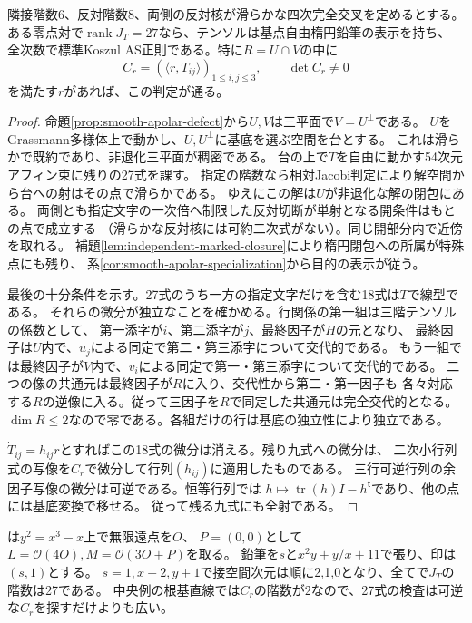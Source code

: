 \begin{theorem}[非横断点を通る相対Jacobi判定]\label{thm:marked-gram-smoothing}
隣接階数6、反対階数8、両側の反対核が滑らかな四次完全交叉を定めるとする。
ある零点対で$\operatorname{rank}J_T=27$なら、テンソルは基点自由楕円鉛筆の表示を持ち、
全次数で標準Koszul AS正則である。特に$R=U\cap V$の中に
\[
 C_r=(\langle r,T_{ij}\rangle)_{1\le i,j\le3},\qquad \det C_r\ne0
\]
を満たす$r$があれば、この判定が通る。
\end{theorem}
\begin{proof}
命題\ref{prop:smooth-apolar-defect}から$U,V$は三平面で$V=U^\perp$である。
$U$をGrassmann多様体上で動かし、$U,U^\perp$に基底を選ぶ空間を台とする。
これは滑らかで既約であり、非退化三平面が稠密である。
台の上で$T$を自由に動かす54次元アフィン束に残りの27式を課す。
指定の階数なら相対Jacobi判定により解空間から台への射はその点で滑らかである。
ゆえにこの解は$U$が非退化な解の閉包にある。
両側とも指定文字の一次倍へ制限した反対切断が単射となる開条件はもとの点で成立する
（滑らかな反対核には可約二次式がない）。同じ開部分内で近傍を取れる。
補題\ref{lem:independent-marked-closure}により楕円閉包への所属が特殊点にも残り、
系\ref{cor:smooth-apolar-specialization}から目的の表示が従う。

最後の十分条件を示す。27式のうち一方の指定文字だけを含む18式は$T$で線型である。
それらの微分が独立なことを確かめる。行関係の第一組は三階テンソルの係数として、
第一添字が$i$、第二添字が$j$、最終因子が$H$の元となり、
最終因子は$U$内で、$u_j$による同定で第二・第三添字について交代的である。
もう一組では最終因子が$V$内で、$v_i$による同定で第一・第三添字について交代的である。
二つの像の共通元は最終因子が$R$に入り、交代性から第二・第一因子も
各々対応する$R$の逆像に入る。従って三因子を$R$で同定した共通元は完全交代的となる。
$\dim R\le2$なので零である。各組だけの行は基底の独立性により独立である。

$\dot T_{ij}=h_{ij}r$とすればこの18式の微分は消える。残り九式への微分は、
二次小行列式の写像を$C_r$で微分して行列$(h_{ij})$に適用したものである。
三行可逆行列の余因子写像の微分は可逆である。恒等行列では
$h\mapsto\operatorname{tr}(h)I-h^{\mathsf t}$であり、他の点には基底変換で移せる。
従って残る九式にも全射である。
\end{proof}

は$y^2=x^3-x$上で無限遠点を$O$、
$P=(0,0)$として$L=\mathcal O(4O), M=\mathcal O(3O+P)$を取る。
鉛筆を$s$と$x^2y+y/x+11$で張り、印は$(s,1)$とする。
$s=1,x-2,y+1$で接空間次元は順に2,1,0となり、全てで$J_T$の階数は27である。
中央例の根基直線では$C_r$の階数が2なので、27式の検査は可逆な$C_r$を探すだけよりも広い。

